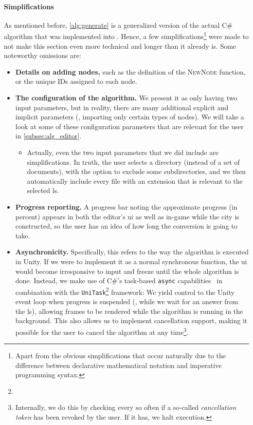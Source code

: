 \documentclass[../thesis]{subfiles}
\begin{document}
\paragraph{Simplifications}
As mentioned before, \cref{alg:generate} is a generalized version of the actual C\# algorithm that was implemented into \SEE{}.
Hence, a few simplifications\footnote{
	Apart from the obvious simplifications that occur naturally due to the difference between declarative mathematical notation and imperative programming syntax.
} were made to not make this section even more technical and longer than it already is.
Some noteworthy omissions are:
\begin{itemize}
	\item \textbf{Details on adding nodes,} such as the definition of the \textsc{NewNode} function, or the unique IDs assigned to each node.
	\item \textbf{The configuration of the algorithm.} We present it as only having two input parameters, but in reality, there are many additional explicit and implicit parameters (\eg, importing only certain types of nodes).
	      We will take a look at some of these configuration parameters that are relevant for the user in \cref{subsec:alg_editor}.
	      \begin{itemize}
		      \item Actually, even the two input parameters that we did include are simplifications.
		            In truth, the user selects a directory (instead of a set of documents), with the option to exclude some subdirectories, and we then automatically include every file with an extension that is relevant to the selected \gls{ls}.
	      \end{itemize}
	\item \textbf{Progress reporting.}
	      A progress bar noting the approximate progress (in percent) appears in both the \gls{editor}'s \gls{ui} as well as in-game while the \gls{city} is constructed, so the user has an idea of how long the conversion is going to take.
	\item \textbf{Asynchronicity.}
	      Specifically, this refers to the way the algorithm is executed in Unity.
	      If we were to implement it as a normal synchronous function, the \gls{ui} would become irresponsive to input and freeze until the whole algorithm is done.
	      Instead, we make use of C\#'s task-based \texttt{async} capabilities~\cite{wagner2023} in combination with the \texttt{UniTask}\footnote{
	      } framework:
	      We yield control to the Unity event loop when progress is suspended (\eg{}, while we wait for an answer from the \gls{ls}), allowing frames to be rendered while the algorithm is running in the background.
	      This also allows us to implement cancellation support, making it possible for the user to cancel the algorithm at any time\footnote{
		      Internally, we do this by checking every so often if a so-called \emph{cancellation token} has been revoked by the user. If it has, we halt execution.
	      }.
\end{itemize}
\end{document}
